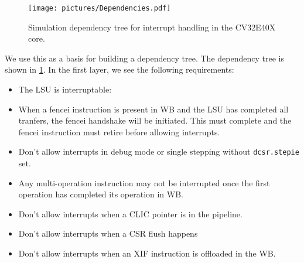 \begin{figure}[ht]
    \centering
    \texttt{[image: pictures/Dependencies.pdf]}
    \caption{Simulation dependency tree for interrupt handling in the CV32E40X core.}
    \label{fig:dependencyTree}
\end{figure}


We use this as a basis for building a dependency tree. The dependency tree is shown in \cref{fig:dependencyTree}. In the first layer, we see the following requirements:


\begin{itemize}
    \item The LSU is interruptable:
    \item When a fencei instruction is present in WB and the LSU has completed all tranfers, the fencei handshake will be initiated. This must complete and the fencei instruction must retire before allowing interrupts. 
    \item Don't allow interrupts in debug mode or single stepping without \lstinline{dcsr.stepie} set.
    \item Any multi-operation instruction may not be interrupted once the first operation has completed its operation in WB.
    \item Don't allow interrupts when a CLIC pointer is in the pipeline.
    \item Don't allow interrupts when a CSR flush happens
    \item Don't allow interrupts when an XIF instruction is offloaded in the WB.
    
\end{itemize}

